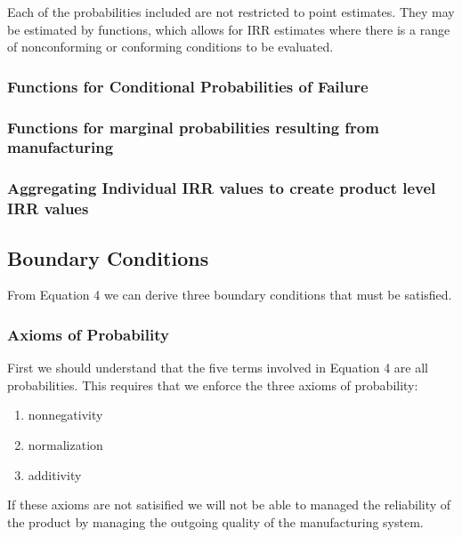 \documentclass[
]{article}
\providecommand{\tightlist}{%
  \setlength{\itemsep}{0pt}\setlength{\parskip}{0pt}}
\begin{document}
Each of the probabilities included are not restricted to point estimates. They may be estimated by functions, which allows for IRR estimates where there is a range of nonconforming or conforming conditions to be evaluated.

\subsubsection{Functions for Conditional Probabilities of Failure}\label{functions-for-conditional-probabilities-of-failure}

\subsubsection{Functions for marginal probabilities resulting from manufacturing}\label{functions-for-marginal-probabilities-resulting-from-manufacturing}

\subsubsection{Aggregating Individual IRR values to create product level IRR values}\label{aggregating-individual-irr-values-to-create-product-level-irr-values}

\subsection{Boundary Conditions}\label{boundary-conditions}

From Equation 4 we can derive three boundary conditions that must be satisfied.

\subsubsection{Axioms of Probability}\label{axioms-of-probability}

First we should understand that the five terms involved in Equation 4 are all probabilities. This requires that we enforce the three axioms of probability:

\begin{enumerate}
\def\labelenumi{\arabic{enumi}.}
\tightlist
\item
  nonnegativity
\item
  normalization
\item
  additivity
\end{enumerate}

If these axioms are not satisified we will not be able to managed the reliability of the product by managing the outgoing quality of the manufacturing system.
\end{document}
